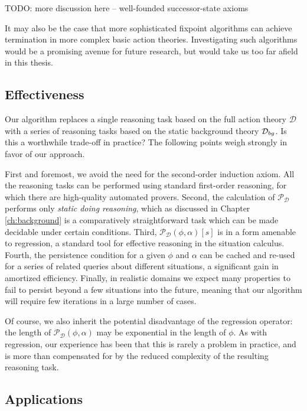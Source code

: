 TODO: more discussion here -- well-founded successor-state axioms

It may also be the case that more sophisticated fixpoint algorithms
can achieve termination in more complex basic action theories. Investigating
such algorithms would be a promising avenue for future research, but
would take us too far afield in this thesis.


\subsection{Effectiveness}

Our algorithm replaces a single reasoning task based on the full action
theory $\mathcal{D}$ with a series of reasoning tasks based on the
static background theory $\mathcal{D}_{bg}$. Is this a worthwhile trade-off
in practice? The following points weigh strongly in favor of our approach.

First and foremost, we avoid the need for the second-order induction
axiom. All the reasoning tasks can be performed using standard first-order
reasoning, for which there are high-quality automated provers. Second,
the calculation of $\mathcal{P_{D}}$ performs only \emph{static doing
reasoning}, which as discussed in Chapter \ref{ch:background} is
a comparatively straightforward task which can be made decidable under
certain conditions. Third, $\mathcal{P}_{\mathcal{D}}(\phi,\alpha)[s]$
is in a form amenable to regression, a standard tool for effective
reasoning in the situation calculus. Fourth, the persistence condition
for a given $\phi$ and $\alpha$ can be cached and re-used for a
series of related queries about different situations, a significant
gain in amortized efficiency. Finally, in realistic domains we expect
many properties to fail to persist beyond a few situations into the
future, meaning that our algorithm will require few iterations in
a large number of cases.

Of course, we also inherit the potential disadvantage of the regression
operator: the length of $\mathcal{P_{D}}(\phi,\alpha)$ may be exponential
in the length of $\phi$. As with regression, our experience has been
that this is rarely a problem in practice, and is more than compensated
for by the reduced complexity of the resulting reasoning task.


\subsection{Applications}


